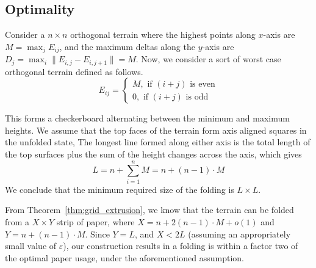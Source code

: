\subsection{Optimality}
\label{sec:optimality}

Consider a $n\times n$ orthogonal terrain where the highest points along $x$-axis are $M = \max_j E_{ij}$,
and the maximum deltas along the $y$-axis are $D_j = \max_i{\|E_{i,j}-E_{i,j+1}\|} = M$.
Now, we consider a sort of worst case orthogonal terrain defined as follows.
$$
E_{ij}=
\begin{cases}
M, \textrm{ if $(i+j)$ is even}\\
0, \textrm{ if $(i+j)$ is odd}
\end{cases}
$$

This forms a checkerboard alternating between the minimum and maximum heights.
We assume that the top faces of the terrain form axis aligned squares in the unfolded state,
The longest line formed along either axis is the total length of the top surfaces plus the sum of the height changes across the axis, which gives
$$L = n + \sum^{n}_{i=1} M = n + (n-1)\cdot M$$
We conclude that the minimum required size of the folding is $L\times L$.

From Theorem~\ref{thm:grid_extrusion}, we know that the terrain can be folded from a $X\times Y$ strip of paper,
where $X = n + 2(n-1)\cdot M + o(1)$ and $Y = n + (n-1)\cdot M$.
Since $Y = L$, and $X < 2L$ (assuming an appropriately small value of $\varepsilon$),
our construction results in a folding is within a factor two of the optimal paper usage, under the aforementioned assumption.




